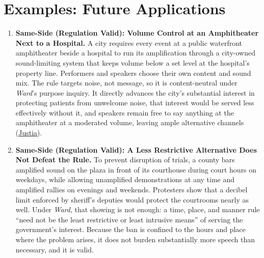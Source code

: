 \documentclass[12pt]{article}
\begin{document}
\section{Examples: Future Applications}
\begin{enumerate}

\item \textbf{Same-Side (Regulation Valid): Volume Control at an Amphitheater Next to a Hospital.} A city requires every event at a public waterfront amphitheater beside a hospital to run its amplification through a city-owned sound-limiting system that keeps volume below a set level at the hospital's property line. Performers and speakers choose their own content and sound mix. The rule targets noise, not message, so it is content-neutral under \textit{Ward}'s purpose inquiry. It directly advances the city's substantial interest in protecting patients from unwelcome noise, that interest would be served less effectively without it, and speakers remain free to say anything at the amphitheater at a moderated volume, leaving ample alternative channels (\href{https://supreme.justia.com/cases/federal/us/491/781/}{Justia}).

\item \textbf{Same-Side (Regulation Valid): A Less Restrictive Alternative Does Not Defeat the Rule.} To prevent disruption of trials, a county bars amplified sound on the plaza in front of its courthouse during court hours on weekdays, while allowing unamplified demonstrations at any time and amplified rallies on evenings and weekends. Protesters show that a decibel limit enforced by sheriff's deputies would protect the courtrooms nearly as well. Under \textit{Ward}, that showing is not enough: a time, place, and manner rule ``need not be the least restrictive or least intrusive means'' of serving the government's interest. Because the ban is confined to the hours and place where the problem arises, it does not burden substantially more speech than necessary, and it is valid.


\end{enumerate}
\end{document}
